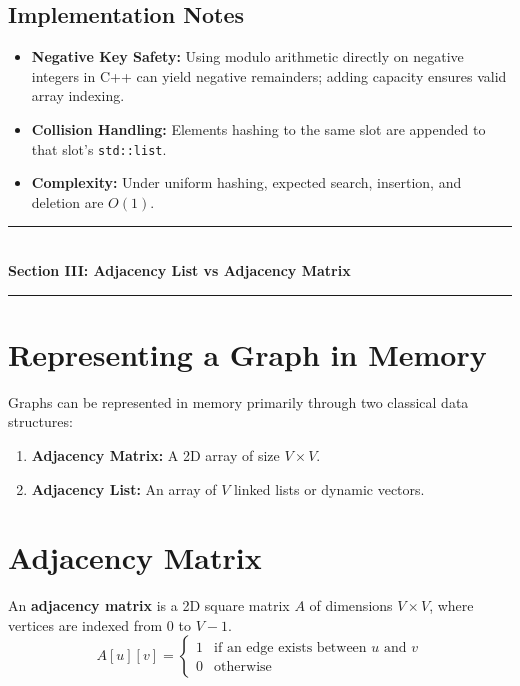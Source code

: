 \subsection{Implementation Notes}
\begin{itemize}
    \item \textbf{Negative Key Safety:} Using modulo arithmetic directly on negative integers in C++ can yield negative remainders; adding capacity ensures valid array indexing.
    \item \textbf{Collision Handling:} Elements hashing to the same slot are appended to that slot's \texttt{std::list}.
    \item \textbf{Complexity:} Under uniform hashing, expected search, insertion, and deletion are $O(1)$.
\end{itemize}

\newpage
\begin{center}
\vspace{0.5em}
{\color{primary}\rule{0.45\textwidth}{1.2pt}}\\[4pt]
{\Large\bfseries\color{primary} Section III: Adjacency List vs Adjacency Matrix}\\[2pt]
{\color{primary}\rule{0.45\textwidth}{1.2pt}}
\vspace{0.5em}
\end{center}

\section{Representing a Graph in Memory}

Graphs can be represented in memory primarily through two classical data structures:
\begin{enumerate}
    \item \textbf{Adjacency Matrix:} A 2D array of size $V \times V$.
    \item \textbf{Adjacency List:} An array of $V$ linked lists or dynamic vectors.
\end{enumerate}

\section{Adjacency Matrix}

An \textbf{adjacency matrix} is a 2D square matrix $A$ of dimensions $V \times V$, where vertices are indexed from $0$ to $V-1$.
\[
A[u][v] = 
\begin{cases} 
1 & \text{if an edge exists between } u \text{ and } v \\
0 & \text{otherwise}
\end{cases}
\]

